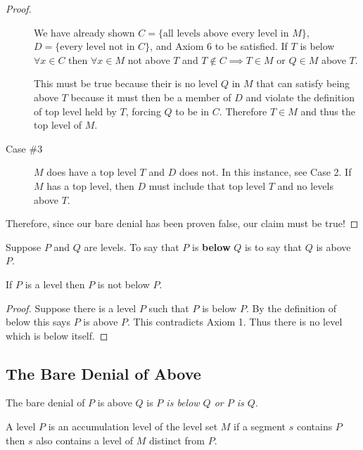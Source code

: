 \begin{proof}
\begin{description}
        We have already shown $C = \{ \text{all levels above every level in $M$} \}$, $D = \{ \text{every level not in $C$} \}$, and Axiom 6 to be satisfied. If $T$ is below $\forall x \in C$ then $\forall x \in M$ not above $T$ and $T \not\in C \implies T \in M$ or $Q \in M$ above $T$.

        This must be true because their is no level $Q$ in $M$ that can satisfy being above $T$ because it must then be a member of $D$ and violate the definition of top level held by $T$, forcing $Q$ to be in $C$. Therefore $T \in M$ and thus the top level of $M$.



        \item[Case \#3] $M$ does have a top level $T$ and $D$ does not. In this instance, see Case 2. If $M$ has a top level, then $D$ must include that top level $T$ and no levels above $T$.
    \end{description}

    Therefore, since our bare denial has been proven false, our claim must be true!
\end{proof}

\problem
Suppose $P$ and $Q$ are levels. To say that $P$ is \textbf{below} $Q$ is to say that $Q$ is above $P$.

\begin{conjecture}
    If $P$ is a level then $P$ is not below $P$.
\end{conjecture}

\begin{proof}
    Suppose there is a level $P$ such that $P$ is below $P$. By the definition of below this says $P$ is above $P$. This contradicts Axiom 1. Thus there is no level which is below itself.
\end{proof}

\subsection{The Bare Denial of Above}
The bare denial of $P$ is above $Q$ is \textit{$P$ is below $Q$ or $P$ is $Q$}.


\problem
\solutionAlt
A level $P$ is an accumulation level of the level set $M$ if a segment $s$ contains $P$ then $s$ also contains a level of $M$ distinct from $P$.


